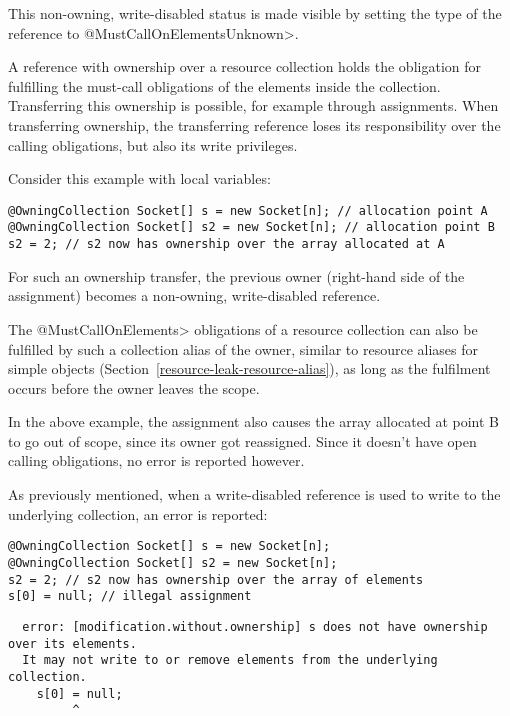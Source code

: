 This non-owning, write-disabled status is made visible by setting the \MustCallOnElements type of the reference to
\<@MustCallOnElementsUnknown>.

A reference with ownership over a resource collection holds the obligation for fulfilling the must-call obligations of the elements inside the collection. Transferring this ownership is possible, for example through assignments. When transferring ownership, the transferring reference loses its responsibility over the calling obligations, but also its write privileges.

Consider this example with local variables:

\begin{Verbatim}
@OwningCollection Socket[] s = new Socket[n]; // allocation point A
@OwningCollection Socket[] s2 = new Socket[n]; // allocation point B
s2 = 2; // s2 now has ownership over the array allocated at A
\end{Verbatim}

For such an ownership transfer, the previous owner (right-hand side of the assignment) becomes a non-owning, write-disabled reference.

The \<@MustCallOnElements> obligations of a resource collection can also be fulfilled by such a collection alias of the owner, similar to resource aliases for simple objects (Section~\ref{resource-leak-resource-alias}), as long as the fulfilment occurs before the owner leaves the scope.

In the above example, the assignment also causes the array allocated at point B to go out of scope, since its owner got reassigned. Since it doesn't have open calling obligations, no error is reported however.

As previously mentioned, when a write-disabled reference is used to write to the underlying collection, an error is reported:

\begin{Verbatim}
@OwningCollection Socket[] s = new Socket[n];
@OwningCollection Socket[] s2 = new Socket[n];
s2 = 2; // s2 now has ownership over the array of elements
s[0] = null; // illegal assignment
\end{Verbatim}

\begin{Verbatim}
  error: [modification.without.ownership] s does not have ownership over its elements.
  It may not write to or remove elements from the underlying collection.
    s[0] = null;
         ^
\end{Verbatim}

